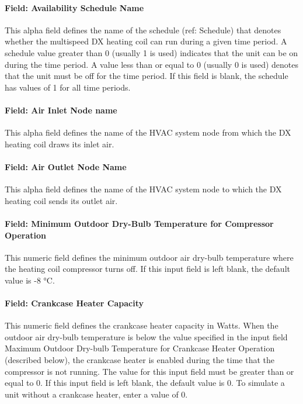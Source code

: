 \paragraph{Field: Availability Schedule Name}\label{field-availability-schedule-name-11-000}

This alpha field defines the name of the schedule (ref: Schedule) that denotes whether the multispeed DX heating coil can run during a given time period. A schedule value greater than 0 (usually 1 is used) indicates that the unit can be on during the time period. A value less than or equal to 0 (usually 0 is used) denotes that the unit must be off for the time period. If this field is blank, the schedule has values of 1 for all time periods.

\paragraph{Field: Air Inlet Node name}\label{field-air-inlet-node-name-14}

This alpha field defines the name of the HVAC system node from which the DX heating coil draws its inlet air.

\paragraph{Field: Air Outlet Node Name}\label{field-air-outlet-node-name-14}

This alpha field defines the name of the HVAC system node to which the DX heating coil sends its outlet air.

\paragraph{Field: Minimum Outdoor Dry-Bulb Temperature for Compressor Operation}\label{field-minimum-outdoor-dry-bulb-temperature-for-compressor-operation-1}

This numeric field defines the minimum outdoor air dry-bulb temperature where the heating coil compressor turns off. If this input field is left blank, the default value is -8 °C.

\paragraph{Field: Crankcase Heater Capacity}\label{field-crankcase-heater-capacity-5}

This numeric field defines the crankcase heater capacity in Watts. When the outdoor air dry-bulb temperature is below the value specified in the input field Maximum Outdoor Dry-bulb Temperature for Crankcase Heater Operation (described below), the crankcase heater is enabled during the time that the compressor is not running. The value for this input field must be greater than or equal to 0. If this input field is left blank, the default value is 0. To simulate a unit without a crankcase heater, enter a value of 0.

